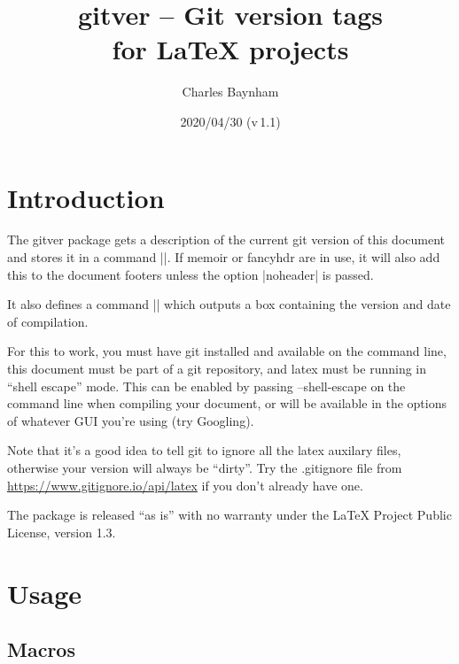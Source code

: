 \documentclass[a4paper]{ltxdoc}
\begin{document}
\title{\textsf{gitver} -- Git version tags \\ 
for \LaTeX{} projects}
\author{Charles Baynham}
\date{2020/04/30 (v\,1.1)}

\maketitle

\section{Introduction}

The \textsf{gitver} package gets a description of the current git version of this
document and stores it in a command |\gitVer|. If memoir or fancyhdr are in use, it
will also add this to the document footers unless the option |noheader| is
passed.

It also defines a command |\versionBox| which outputs a box containing the
version and date of compilation. 

For this to work, you must have git installed and available on the command
line, this document must be part of a git repository, and latex must be
running in ``shell escape'' mode. This can be enabled by passing \textsf{--shell-escape}
on the command line when compiling your document, or will be available in the
options of whatever GUI you're using (try Googling).

Note that it's a good idea to tell git to ignore all the latex auxilary files,
otherwise your version will always be ``dirty''. Try the \textsf{.gitignore} file from
\url{https://www.gitignore.io/api/latex} if you don't already have
one.

The package is released ``as is'' with no warranty under the LaTeX Project Public
License, version 1.3.

\section{Usage}

\subsection{Macros} %
\label{sub:macros}
\end{document}

